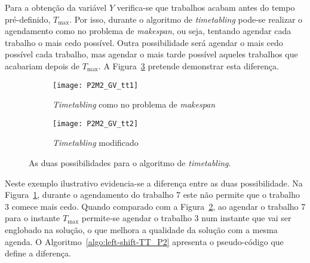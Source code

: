 Para a obtenção da variável $Y$ verifica-se que trabalhos acabam antes do tempo pré-definido, $T_{\max}$. Por isso, durante o algoritmo de \textit{timetabling} pode-se realizar o agendamento como no problema de \textit{makespan}, ou seja, tentando agendar cada trabalho o mais cedo possível. Outra possibilidade será agendar o mais cedo possível cada trabalho, mas agendar o mais tarde possível aqueles trabalhos que acabariam depois de $T_{\max}$. A Figura~\ref{fig:P2M2_GV_tt} pretende demonstrar esta diferença.\\
\begin{figure}[H]
	\centering
	\begin{subfigure}{0.49\textwidth}
	\centering
		\texttt{[image: P2M2\_GV\_tt1]}
		\caption{\textit{Timetabling} como no problema de \textit{makespan}}
		\label{fig:P2M2_GV_tt1}
	\end{subfigure}
	\begin{subfigure}{0.49\textwidth}
	\centering
		\texttt{[image: P2M2\_GV\_tt2]}
		\caption{\textit{Timetabling} modificado}
		\label{fig:P2M2_GV_tt2}
	\end{subfigure}
	\caption{As duas possibilidades para o algoritmo de \textit{timetabling}.}
	\label{fig:P2M2_GV_tt}
\end{figure}

Neste exemplo ilustrativo evidencia-se a diferença entre as duas possibilidade. Na Figura~\ref{fig:P2M2_GV_tt1}, durante o agendamento do trabalho 7 este não permite que o trabalho 3 comece mais cedo. Quando comparado com a Figura~\ref{fig:P2M2_GV_tt2}, ao agendar o trabalho 7 para o instante $T_{\max}$ permite-se agendar o trabalho 3 num instante que vai ser englobado na solução, o que melhora a qualidade da solução com a mesma agenda. O Algoritmo~\ref{algo:left-shift-TT_P2} apresenta o pseudo-código que define a diferença.\\
 
